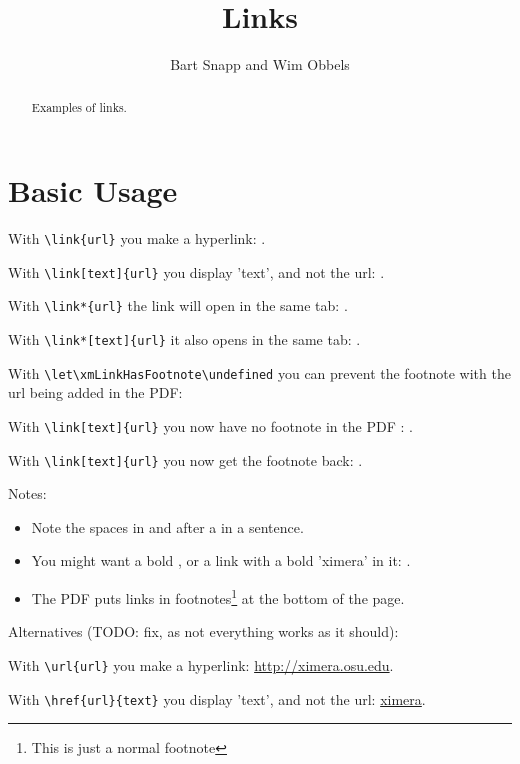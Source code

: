 \documentclass[noauthor]{ximera}
\title{Links}
\author{Bart Snapp and Wim Obbels}
\begin{document}
\begin{abstract}
  Examples of links.
\end{abstract}
\maketitle

\section*{Basic Usage}\label{sec:link:basicUsage}

With \verb|\link{url}| you make a hyperlink: .

With \verb|\link[text]{url}| you display 'text', and not the url: .

With \verb|\link*{url}| the link will open in the same tab: .

With \verb|\link*[text]{url}| it also opens in the same tab: .

With \verb|\let\xmLinkHasFootnote\undefined| you can prevent the footnote with the url being added in the PDF:

{
  \let\xmLinkHasFootnote\undefined
  With \verb|\link[text]{url}| you now have no footnote in the PDF : .
}

With \verb*|\link[text]{url}| you now get the footnote back: .


Notes: 
\begin{itemize}
 \item \label{link_spaces}   Note the spaces in and after a  in a sentence.
 \item \label{link_bold}     You might want a bold \textbf{}, or a link with a bold 'ximera' in it: .
 \item \label{link_footnote} The PDF puts links in footnotes\footnote{This is just a normal footnote} at the bottom of the page.
\end{itemize}

Alternatives (TODO: fix, as not everything works as it should):

With \verb|\url{url}| you make a hyperlink: \url{http://ximera.osu.edu}.

With \verb|\href{url}{text}| you display 'text', and not the url: \href{http://ximera.osu.edu}{ximera}.
\end{document}
